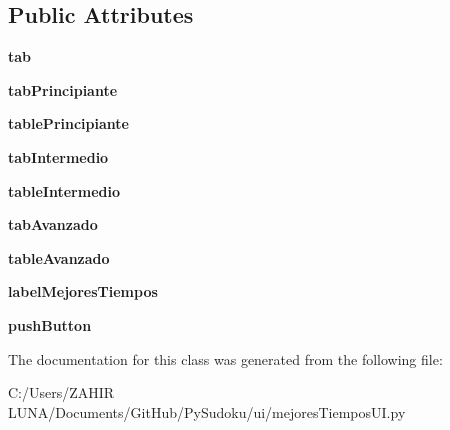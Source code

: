 \subsection*{Public Attributes}
\begin{DoxyCompactItemize}
\item 
\hypertarget{classmejores_tiempos_u_i_1_1_ui___mejores_tiempos_aa8cd68c61a7f36c8e6cc03089279d252}{{\bfseries tab}}\label{classmejores_tiempos_u_i_1_1_ui___mejores_tiempos_aa8cd68c61a7f36c8e6cc03089279d252}

\item 
\hypertarget{classmejores_tiempos_u_i_1_1_ui___mejores_tiempos_a1f9270a09ec22df65af2c88f22272d2d}{{\bfseries tab\-Principiante}}\label{classmejores_tiempos_u_i_1_1_ui___mejores_tiempos_a1f9270a09ec22df65af2c88f22272d2d}

\item 
\hypertarget{classmejores_tiempos_u_i_1_1_ui___mejores_tiempos_abc7def506bcb43a74f16e2d3f42b44a2}{{\bfseries table\-Principiante}}\label{classmejores_tiempos_u_i_1_1_ui___mejores_tiempos_abc7def506bcb43a74f16e2d3f42b44a2}

\item 
\hypertarget{classmejores_tiempos_u_i_1_1_ui___mejores_tiempos_a5ba8a8ab05843d64b9d940d436351ce3}{{\bfseries tab\-Intermedio}}\label{classmejores_tiempos_u_i_1_1_ui___mejores_tiempos_a5ba8a8ab05843d64b9d940d436351ce3}

\item 
\hypertarget{classmejores_tiempos_u_i_1_1_ui___mejores_tiempos_a5c7d5b9816496271ee8f575407f62074}{{\bfseries table\-Intermedio}}\label{classmejores_tiempos_u_i_1_1_ui___mejores_tiempos_a5c7d5b9816496271ee8f575407f62074}

\item 
\hypertarget{classmejores_tiempos_u_i_1_1_ui___mejores_tiempos_a96e6b62d20314aa8135213e1b682be27}{{\bfseries tab\-Avanzado}}\label{classmejores_tiempos_u_i_1_1_ui___mejores_tiempos_a96e6b62d20314aa8135213e1b682be27}

\item 
\hypertarget{classmejores_tiempos_u_i_1_1_ui___mejores_tiempos_ae5921b387d85a354e084cc4e631eee06}{{\bfseries table\-Avanzado}}\label{classmejores_tiempos_u_i_1_1_ui___mejores_tiempos_ae5921b387d85a354e084cc4e631eee06}

\item 
\hypertarget{classmejores_tiempos_u_i_1_1_ui___mejores_tiempos_a83fa8701e748d74c24954570349860cd}{{\bfseries label\-Mejores\-Tiempos}}\label{classmejores_tiempos_u_i_1_1_ui___mejores_tiempos_a83fa8701e748d74c24954570349860cd}

\item 
\hypertarget{classmejores_tiempos_u_i_1_1_ui___mejores_tiempos_ae8e938354726bd2ac50902586b157505}{{\bfseries push\-Button}}\label{classmejores_tiempos_u_i_1_1_ui___mejores_tiempos_ae8e938354726bd2ac50902586b157505}

\end{DoxyCompactItemize}


The documentation for this class was generated from the following file\-:\begin{DoxyCompactItemize}
\item 
C\-:/\-Users/\-Z\-A\-H\-I\-R  L\-U\-N\-A/\-Documents/\-Git\-Hub/\-Py\-Sudoku/ui/mejores\-Tiempos\-U\-I.\-py\end{DoxyCompactItemize}

